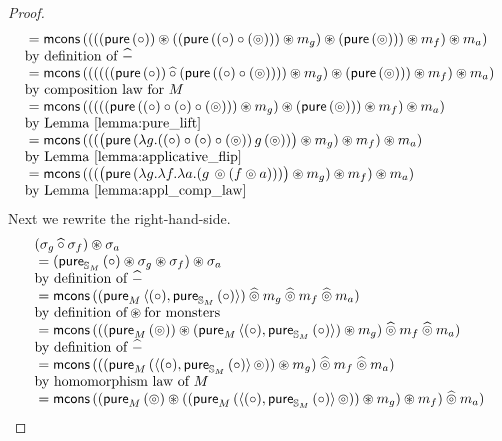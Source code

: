 \begin{lemma}
\begin{proof}
$$\begin{array}{ll}
{}= \mcons\,( (  ( (\apure\, (\comp)) \appl ( (\apure\, ((\comp) \comp (\pappl)) ) \appl m_g ) \appl (\apure\, (\pappl)) ) \appl m_f  ) \appl m_a)\\
 \mbox{by definition of }\alift{-} \\
{}= \mcons\,( (  ( (  ((\apure\, (\comp)) \alift{\comp}  (\apure\, ((\comp) \comp (\pappl)) )) \appl m_g  ) \appl (\apure\, (\pappl)) ) \appl m_f  ) \appl m_a)\\
 \mbox{by composition law for }M \\
{}= \mcons\,( (  ( (  (\apure\, ((\comp) \comp (\comp) \comp (\pappl))) \appl m_g  ) \appl (\apure\, (\pappl)) ) \appl m_f  ) \appl m_a)\\
 \mbox{by Lemma \ref{lemma:pure_lift}}\\
{}= \mcons\,( (  (  \big(\apure\, (\lambda g . ((\comp) \comp (\comp) \comp (\pappl))\, g\, (\pappl) ) \big) \appl m_g   ) \appl m_f  ) \appl m_a)\\
 \mbox{by Lemma \ref{lemma:applicative_flip}}\\
 {}= \mcons\,( (  (  \big(\apure\, (\lambda g . \lambda f . \lambda a . (g\, \pappl (f \pappl a)) ) \big) \appl m_g   ) \appl m_f  ) \appl m_a)\\
 \mbox{by Lemma \ref{lemma:appl_comp_law}}\\
\end{array}
$$
Next we rewrite the right-hand-side.
$$
\begin{array}{ll}
(\sigma_g \alift{\comp} \sigma_f) \appl \sigma_a \\
{}= (\apure_{\stream{M}}\,(\comp) \appl \sigma_g \appl \sigma_f) \appl \sigma_a \\
\mbox{by definition of }\alift{-}\\
{}= \mcons\, ((\apure_M\,\pair{(\comp)}{\apure_{\stream{M}}\,(\comp)}) \alift{\pappl} m_g \alift{\pappl} m_f \alift{\pappl} m_a)\\
\mbox{by definition of}\appl\mbox{for monsters}\\
{}= \mcons\, (((\apure_M\,(\pappl)) \appl (\apure_M\,\pair{(\comp)}{\apure_{\stream{M}}\,(\comp)}) \appl m_g) \alift{\pappl} m_f \alift{\pappl} m_a)\\
\mbox{by definition of }\alift{-}\\
{}= \mcons\, (((\apure_M\,(\pair{(\comp)}{\apure_{\stream{M}}\,(\comp)}\, \pappl)) \appl m_g) \alift{\pappl} m_f \alift{\pappl} m_a)\\
 \mbox{by homomorphism law of }M\\
{}= \mcons\, ((\apure_M\,(\pappl) \appl ((\apure_M\,(\pair{(\comp)}{\apure_{\stream{M}}\,(\comp)}\, \pappl)) \appl m_g) \appl m_f) \alift{\pappl} m_a)\\

\end{array}$$
\end{proof}
\end{lemma}
